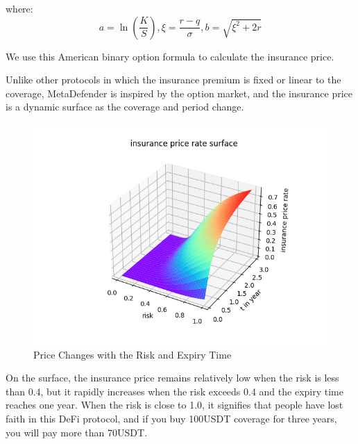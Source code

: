 where:
\begin{equation}
	a = \ln(\frac{K}{S}), \xi = \frac{r-q}{\sigma}, b = \sqrt {\xi^2 + 2r}\label{eq:equation5}
\end{equation}

We use this American binary option formula to calculate the insurance price.

Unlike other protocols in which the insurance premium is fixed or linear to the coverage, MetaDefender is inspired by the option market, and the insurance price is a dynamic surface as the coverage and period change.

\begin{figure}[H]
	\includegraphics[width=\linewidth]{insurance_price_rate_surface} %
	\caption{Price Changes with the Risk and Expiry Time} %
	\label{fig:surface} %
\end{figure}

On the surface, the insurance price remains relatively low when the risk is less than 0.4, but it rapidly increases when the risk exceeds 0.4 and the expiry time reaches one year.
When the risk is close to 1.0, it signifies that people have lost faith in this DeFi protocol, and if you buy 100USDT coverage for three years, you will pay more than 70USDT.